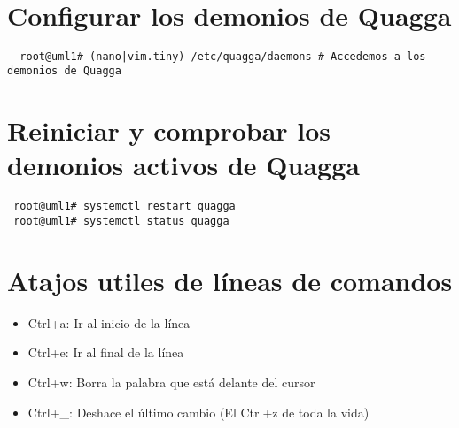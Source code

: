 \documentclass{article}
\begin{document}
\section{}
\begin{verbatim}
\end{verbatim}

\section{}
\begin{verbatim}
\end{verbatim}

\section{}
\begin{verbatim}
\end{verbatim}

\section{Configurar los demonios de Quagga}
\begin{verbatim}
  root@uml1# (nano|vim.tiny) /etc/quagga/daemons # Accedemos a los demonios de Quagga
\end{verbatim}

\section{Reiniciar y comprobar los demonios activos de Quagga}
\begin{verbatim}
 root@uml1# systemctl restart quagga
 root@uml1# systemctl status quagga
\end{verbatim}

\section{Atajos utiles de líneas de comandos}
\begin{itemize}
  \item Ctrl+a: Ir al inicio de la línea
  \item Ctrl+e: Ir al final de la línea
  \item Ctrl+w: Borra la palabra que está delante del cursor
  \item Ctrl+\_: Deshace el último cambio (El Ctrl+z de toda la vida)
\end{itemize}
\end{document}
